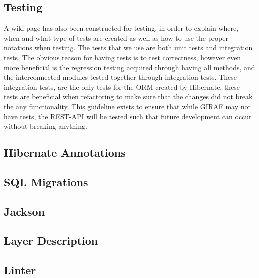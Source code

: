 \subsection{Testing}
A wiki page has also been constructed for testing, in order to explain where, when and what type of tests are created as well as how to use the proper notations when testing.
The tests that we use are both unit tests and integration tests.
The obvious reason for having tests is to test correctness, however even more beneficial is the regression testing acquired through having all methods, and the interconnected modules tested together through integration tests.
These integration tests, are the only tests for the ORM created by Hibernate, these tests are beneficial when refactoring to make sure that the changes did not break the any functionality.
This guideline exists to ensure that while GIRAF may not have tests, the REST-API will be tested such that future development can occur without breaking anything.

\subsection{Hibernate Annotations}


\subsection{SQL Migrations}
\subsection{Jackson}
\subsection{Layer Description}
\subsection{Linter}